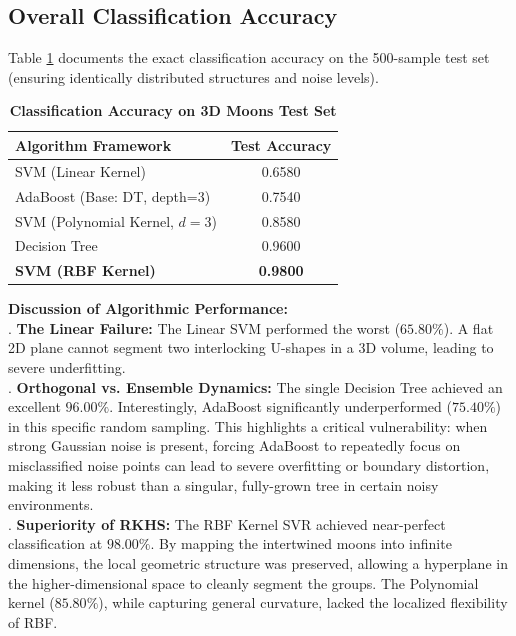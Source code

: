 \documentclass[12pt,a4paper]{article}
\begin{document}
\subsection{Overall Classification Accuracy}
Table \ref{tab:metrics} documents the exact classification accuracy on the 500-sample test set (ensuring identically distributed structures and noise levels).

\begin{table}[H] 
    \centering 
    \caption{\textbf{Classification Accuracy on 3D Moons Test Set}} 
    \begin{tabular}{lc} 
        \toprule 
        \textbf{Algorithm Framework} & \textbf{Test Accuracy} \\
        \midrule 
        SVM (Linear Kernel) & 0.6580 \\
        AdaBoost (Base: DT, depth=3) & 0.7540 \\
        SVM (Polynomial Kernel, $d=3$) & 0.8580 \\
        Decision Tree & 0.9600 \\
        \textbf{SVM (RBF Kernel)} & \textbf{0.9800} \\
        \bottomrule 
    \end{tabular}
    \label{tab:metrics} 
\end{table}

\textbf{Discussion of Algorithmic Performance:}\\
. \textbf{The Linear Failure:} The Linear SVM performed the worst ($65.80\%$). A flat 2D plane cannot segment two interlocking U-shapes in a 3D volume, leading to severe underfitting. \\
. \textbf{Orthogonal vs. Ensemble Dynamics:} The single Decision Tree achieved an excellent $96.00\%$. Interestingly, AdaBoost significantly underperformed ($75.40\%$) in this specific random sampling. This highlights a critical vulnerability: when strong Gaussian noise is present, forcing AdaBoost to repeatedly focus on misclassified noise points can lead to severe overfitting or boundary distortion, making it less robust than a singular, fully-grown tree in certain noisy environments.\\
. \textbf{Superiority of RKHS:} The RBF Kernel SVR achieved near-perfect classification at $98.00\%$. By mapping the intertwined moons into infinite dimensions, the local geometric structure was preserved, allowing a hyperplane in the higher-dimensional space to cleanly segment the groups. The Polynomial kernel ($85.80\%$), while capturing general curvature, lacked the localized flexibility of RBF.
\end{document}
